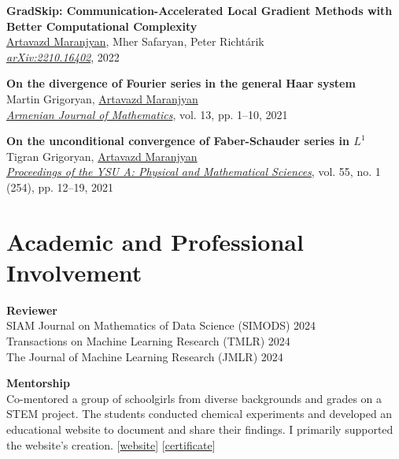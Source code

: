 \documentclass[11pt,a4paper,sans]{moderncv}        %
\begin{document}
\begin{etaremune}
\item \textbf{GradSkip: Communication-Accelerated Local Gradient Methods with Better Computational Complexity}\\
\underline{Artavazd Maranjyan}, Mher Safaryan, Peter Richtárik\\
\textcolor{accent}{\href{https://arxiv.org/abs/2210.16402}{\textit{arXiv:2210.16402}}}, 2022

\item \textbf{On the divergence of Fourier series in the general Haar system}\\
Martin Grigoryan, \underline{Artavazd Maranjyan}\\ \textcolor{accent}{\href{https://doi.org/10.52737/18291163-2021.13.6-1-10}{\textit{Armenian Journal of Mathematics}}}, vol. 13, pp. 1–10, 2021

\item \textbf{On the unconditional convergence of Faber-Schauder series in $L^1$}\\
Tigran Grigoryan, \underline{Artavazd Maranjyan}\\
\textcolor{accent}{\href{http://www.old.ysu.am/files/vol55\_no1\_2021\_pp12\%E2\%80\%9319.pdf}{\textit{Proceedings of the YSU A: Physical and Mathematical Sciences}}}, vol. 55, no. 1 (254), pp. 12–19, 2021
\end{etaremune}

\section{Academic and Professional Involvement}

\textbf{Reviewer}\\
SIAM Journal on Mathematics of Data Science (SIMODS) 2024\\
Transactions on Machine Learning Research (TMLR) 2024\\
The Journal of Machine Learning Research (JMLR) 2024

\vspace{5pt}

\textbf{Mentorship}\\
Co-mentored a group of schoolgirls from diverse backgrounds and grades on a STEM project. 
The students conducted chemical experiments and developed an educational website to document and share their findings. 
I primarily supported the website's creation.  
[\href{https://artomaranjyan.github.io/cheminno/}{website}] [\textcolor{accent}{\href{https://artomaranjyan.github.io/assets/pdf/feminno_certificate.pdf}{certificate}}]
\end{document}
